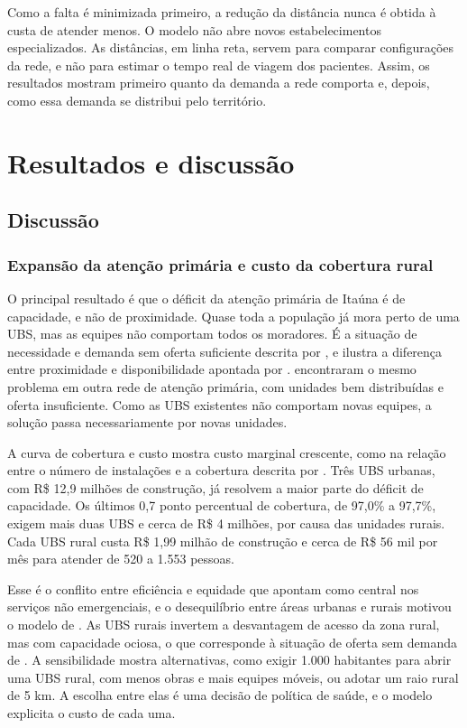 \documentclass[12pt,a4paper,oneside]{report}
\begin{document}
Como a falta é minimizada primeiro, a redução da distância nunca é obtida à custa de atender menos. O
modelo não abre novos estabelecimentos especializados. As distâncias, em linha reta, servem para
comparar configurações da rede, e não para estimar o tempo real de viagem dos pacientes. Assim, os
resultados mostram primeiro quanto da demanda a rede comporta e, depois, como essa demanda se distribui
pelo território.



\chapter{Resultados e discussão}


\section{Discussão}\label{sec:discussao}

\subsection{Expansão da atenção primária e custo da cobertura rural}
O principal resultado é que o déficit da atenção primária de Itaúna é de capacidade, e não de
proximidade. Quase toda a população já mora perto de uma UBS, mas as equipes não comportam todos os
moradores. É a situação de necessidade e demanda sem oferta suficiente descrita por \citet{santana2023}, e
ilustra a diferença entre proximidade e disponibilidade apontada por \citet{guagliardo2004}.
\citet{elorza2022} encontraram o mesmo problema em outra rede de atenção primária, com unidades bem
distribuídas e oferta insuficiente. Como as UBS existentes não comportam novas equipes, a solução passa
necessariamente por novas unidades.

A curva de cobertura e custo mostra custo marginal crescente, como na relação entre o número de
instalações e a cobertura descrita por \citet{church1974}. Três UBS urbanas, com R\$ 12,9 milhões de
construção, já resolvem a maior parte do déficit de capacidade. Os últimos 0,7 ponto percentual de
cobertura, de 97,0\% a 97,7\%, exigem mais duas UBS e cerca de R\$ 4 milhões, por causa das unidades
rurais. Cada UBS rural custa R\$ 1,99 milhão de construção e cerca de R\$ 56 mil por mês para atender de
520 a 1.553 pessoas.

Esse é o conflito entre eficiência e equidade que \citet{ahmadi2017} apontam como central nos serviços
não emergenciais, e o desequilíbrio entre áreas urbanas e rurais motivou o modelo de \citet{hodgson1988}.
As UBS rurais invertem a desvantagem de acesso da zona rural, mas com capacidade ociosa, o que corresponde
à situação de oferta sem demanda de \citet{santana2023}. A sensibilidade mostra alternativas, como exigir
1.000 habitantes para abrir uma UBS rural, com menos obras e mais equipes móveis, ou adotar um raio rural
de 5 km. A escolha entre elas é uma decisão de política de saúde, e o modelo explicita o custo de cada uma.
\end{document}
